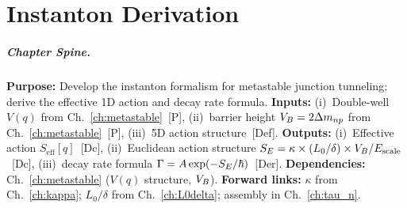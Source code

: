 
\chapter{Instanton Derivation}
\label{ch:instanton}


\begin{abstract}
How does the metastable junction escape from its metastable configuration? In EDC, the
decay proceeds via \emph{quantum tunneling}---a topological transition through
the energy barrier identified in Chapter~\ref{ch:metastable}. This chapter
develops the instanton formalism: the effective 1D action $S_{\text{eff}}[q]$,
the Euclidean ``bounce'' solution, and the decay rate formula
$\Gamma = A \exp(-\SE/\hbar)$. The key parameters $\kappa$ and $\Lzero/\bdelta$
are deferred to Chapters~\ref{ch:kappa}--\ref{ch:L0delta}.
\end{abstract}

\paragraph{Chapter Spine.}
\textbf{Purpose:} Develop the instanton formalism for metastable junction tunneling;
derive the effective 1D action and decay rate formula.
\textbf{Inputs:} (i)~Double-well $V(q)$ from Ch.~\ref{ch:metastable}~[P],
(ii)~barrier height $V_B = 2\Delta m_{np}$ from Ch.~\ref{ch:metastable}~[P],
(iii)~5D action structure~[Def].
\textbf{Outputs:} (i)~Effective action $S_{\text{eff}}[q]$~[Dc],
(ii)~Euclidean action structure $S_E = \kappa \times (L_0/\delta) \times V_B/E_{\text{scale}}$~[Dc],
(iii)~decay rate formula $\Gamma = A \exp(-\SE/\hbar)$~[Der].
\textbf{Dependencies:} Ch.~\ref{ch:metastable} ($V(q)$ structure, $V_B$).
\textbf{Forward links:} $\kappa$ from Ch.~\ref{ch:kappa}; $L_0/\delta$ from Ch.~\ref{ch:L0delta};
assembly in Ch.~\ref{ch:tau_n}.

